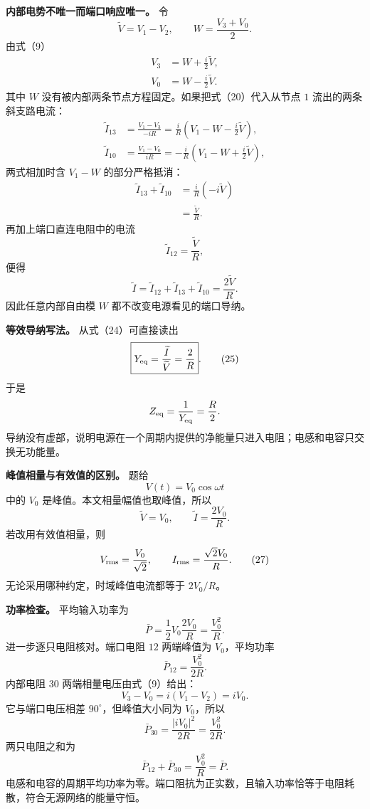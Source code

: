 \documentclass[12pt,a4paper,UTF8]{ctexart}
\begin{document}
\textbf{内部电势不唯一而端口响应唯一。} 令 \[
\widetilde V=V_1-V_2,
\qquad
W=\frac{V_3+V_0}{2}. \tag{19}
\] 由式（9） \[
\begin{aligned}
V_3&=W+\frac i2\widetilde V,\\
V_0&=W-\frac i2\widetilde V.
\end{aligned} \tag{20}
\] 其中 \(W\) 没有被内部两条节点方程固定。如果把式（20）代入从节点 \(1\)
流出的两条斜支路电流： \[
\begin{aligned}
\widetilde I_{13}
&=\frac{V_1-V_3}{-iR}
=\frac iR
\left(
V_1-W-\frac i2\widetilde V
\right),\\
\widetilde I_{10}
&=\frac{V_1-V_0}{iR}
=-\frac iR
\left(
V_1-W+\frac i2\widetilde V
\right),
\end{aligned} \tag{21}
\] 两式相加时含 \(V_1-W\) 的部分严格抵消： \[
\begin{aligned}
\widetilde I_{13}+\widetilde I_{10}
&=\frac iR(-i\widetilde V)\\
&=\frac{\widetilde V}{R}.
\end{aligned} \tag{22}
\] 再加上端口直连电阻中的电流 \[
\widetilde I_{12}=\frac{\widetilde V}{R}, \tag{23}
\] 便得 \[
\widetilde I
=\widetilde I_{12}
+\widetilde I_{13}
+\widetilde I_{10}
=\frac{2\widetilde V}{R}. \tag{24}
\] 因此任意内部自由模 \(W\) 都不改变电源看见的端口导纳。

\textbf{等效导纳写法。} 从式（24）可直接读出 \[
\boxed{
Y_{\rm eq}
=\frac{\widetilde I}{\widetilde V}
=\frac2R
}. \tag{25}
\] 于是 \[
Z_{\rm eq}=\frac1{Y_{\rm eq}}=\frac R2.
\]
导纳没有虚部，说明电源在一个周期内提供的净能量只进入电阻；电感和电容只交换无功能量。

\textbf{峰值相量与有效值的区别。} 题给 \[
V(t)=V_0\cos\omega t
\] 中的 \(V_0\) 是峰值。本文相量幅值也取峰值，所以 \[
\widetilde V=V_0,
\qquad
\widetilde I=\frac{2V_0}{R}. \tag{26}
\] 若改用有效值相量，则 \[
V_{\rm rms}=\frac{V_0}{\sqrt2},
\qquad
I_{\rm rms}=\frac{\sqrt2V_0}{R}. \tag{27}
\] 无论采用哪种约定，时域峰值电流都等于 \(2V_0/R\)。

\textbf{功率检查。} 平均输入功率为 \[
\bar P
=\frac12V_0\frac{2V_0}{R}
=\frac{V_0^2}{R}. \tag{28}
\] 进一步逐只电阻核对。端口电阻 \(12\) 两端峰值为 \(V_0\)，平均功率 \[
\bar P_{12}
=\frac{V_0^2}{2R}. \tag{29}
\] 内部电阻 \(30\) 两端相量电压由式（9）给出： \[
V_3-V_0=i(V_1-V_2)=iV_0. \tag{30}
\] 它与端口电压相差 \(90^\circ\)，但峰值大小同为 \(V_0\)，所以 \[
\bar P_{30}
=\frac{|iV_0|^2}{2R}
=\frac{V_0^2}{2R}. \tag{31}
\] 两只电阻之和为 \[
\bar P_{12}+\bar P_{30}
=\frac{V_0^2}{R}
=\bar P. \tag{32}
\]
电感和电容的周期平均功率为零。端口阻抗为正实数，且输入功率恰等于电阻耗散，符合无源网络的能量守恒。
\end{document}
